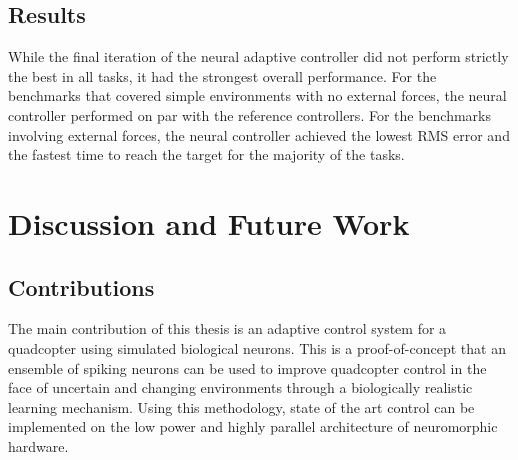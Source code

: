 \documentclass[letterpaper,12pt,titlepage,oneside,final]{book}
\begin{document}
\section{Results}


While the final iteration of the neural adaptive controller did not perform strictly the best in all tasks, it had the strongest overall performance.
For the benchmarks that covered simple environments with no external forces, the neural controller performed on par with the reference controllers.
For the benchmarks involving external forces, the neural controller achieved the lowest RMS error and the fastest time to reach the target for the majority of the tasks.


 
\chapter{Discussion and Future Work} \label{chap:discussion}

\section{Contributions}


The main contribution of this thesis is an adaptive control system for a quadcopter using simulated biological neurons.
This is a proof-of-concept that an ensemble of spiking neurons can be used to improve quadcopter control in the face of uncertain and changing environments through a biologically realistic learning mechanism.
Using this methodology, state of the art control can be implemented on the low power and highly parallel architecture of neuromorphic hardware.
\end{document}
